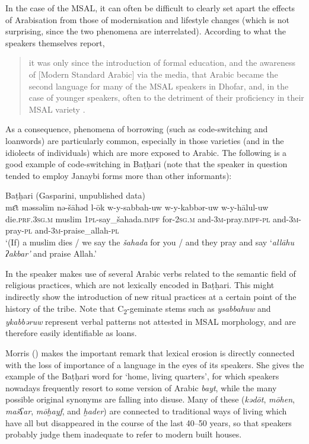 \documentclass[output=paper]{langsci/langscibook}
\begin{document}
In the case of the MSAL, it can often be difficult to clearly set apart the effects of Arabisation from those of modernisation and lifestyle changes (which is not surprising, since the two phenomena are interrelated). According to what the speakers themselves report, 

\begin{quote}
{it was only since the introduction of formal education, and the awareness of} [Modern Standard Arabic] via the media, that Arabic became the second language for many of the MSAL speakers in Dhofar, and, in the case of younger speakers, often to the detriment of their proficiency in their MSAL variety \citep[11]{Davey2016}.
\end{quote}

As a consequence, phenomena of borrowing (such as code-switching and loanwords) are particularly common, especially in those varieties (and in the idiolects of individuals) which are more exposed to Arabic. The following is a good example of code-switching in Baṭḥari (note that the speaker in question tended to employ Janaybi forms more than other informants):

\ea\label{ex:key:allah}
{Baṭḥari (Gasparini, unpublished data)}\\
\gll mɛ̄t məssəlīm nə-šāhəd l-ōk w-y-sabbah-uw w-y-kabbər-uw w-y-hālul-uw\\
     die.\textsc{prf.3sg.m} muslim \textsc{1pl-}say\_šahada.\textsc{impf} for-\textsc{2sg.m} and-\textsc{3m-}pray.\textsc{impf-pl} and-3\textsc{m}-pray-\textsc{pl} and-\textsc{3m-}praise\_allah-\textsc{pl}\\
\glt `(If) a muslim dies / we say the \textit{šahada} for you / and they pray and say ‘\textit{allāhu} \textit{ʔakbar’} and praise Allah.'
\z

In  the speaker makes use of several Arabic verbs related to the semantic field of religious practices, which are not lexically encoded in Baṭḥari. This might indirectly show the introduction of new ritual practices at a certain point of the history of the tribe. Note that C\textsubscript{2}-geminate stems such as \textit{ysabbahuw} and \mbox{\textit{ykabbəruw}} represent verbal patterns not attested in MSAL morphology, and are therefore easily identifiable as loans.

Morris (\citeyear[15]{Morris2017}) makes the important remark that lexical erosion is directly connected with the loss of importance of a language in the eyes of its speakers. She gives the example of the Baṭḥari word for ‘home, living quarters’, for which speakers nowadays frequently resort to some version of Arabic \textit{bayt}, while the many possible original synonyms are falling into disuse. Many of these (\textit{kədōt}, \textit{mōhen}, \textit{mašʕar}, \textit{mōḫayf}, and \textit{ḫader}) are connected to traditional ways of living which have all but disappeared in the course of the last 40--50 years, so that speakers probably judge them inadequate to refer to modern built houses. 
\end{document}
